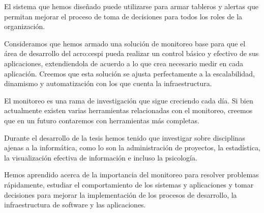 El sistema que hemos diseñado puede utilizarse para armar tableros y alertas
que permitan mejorar el proceso de toma de decisiones para todos los roles de
la organización.

Consideramos que hemos armado una solución de monitoreo base para que el área
de desarrollo del \gls{acro:cespi} pueda realizar un control básico y efectivo
de sus aplicaciones, extendiendola de acuerdo a lo que crea necesario medir en
cada aplicación. Creemos que esta solución se ajusta perfectamente a la
escalabilidad, dinamismo y automatización con los que cuenta la
infraestructura.

El monitoreo es una rama de investigación que sigue creciendo cada día. Si bien
actualmente existen varias herramientas relacionadas con el monitoreo, creemos
que en un futuro contaremos con herramientas más completas.

Durante el desarrollo de la tesis hemos tenido que investigar sobre disciplinas
ajenas a la informática, como lo son la administración de proyectos, la
estadística, la visualización efectiva de información e incluso la psicología.

Hemos aprendido acerca de la importancia del monitoreo para resolver problemas
rápidamente, estudiar el comportamiento de los sistemas y aplicaciones y tomar
decisiones para mejorar la implementación de los procesos de desarrollo, la
infraestructura de software y las aplicaciones.

